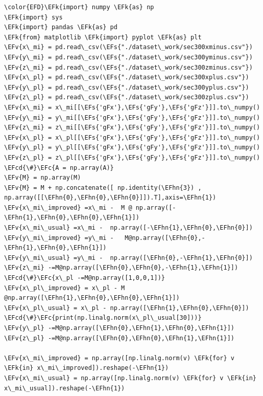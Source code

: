 \documentclass[11pt]{article}
\newcommand{\EFc}[1]{\textcolor{EFc}{#1}} %
\newcommand{\EFcd}[1]{\textcolor{EFcd}{#1}} %
\newcommand{\EFs}[1]{\textcolor{EFs}{#1}} %
\newcommand{\EFk}[1]{\textcolor{EFk}{#1}} %
\newcommand{\EFv}[1]{\textcolor{EFv}{#1}} %
\newcommand{\EFhn}[1]{\textcolor{EFhn}{#1}} %
\begin{document}
\begin{Code}
\begin{Verbatim}
\color{EFD}\EFk{import} numpy \EFk{as} np
\EFk{import} sys
\EFk{import} pandas \EFk{as} pd
\EFk{from} matplotlib \EFk{import} pyplot \EFk{as} plt 
\EFv{x\_mi} = pd.read\_csv(\EFs{"./dataset\_work/sec300xminus.csv"})
\EFv{y\_mi} = pd.read\_csv(\EFs{"./dataset\_work/sec300yminus.csv"})
\EFv{z\_mi} = pd.read\_csv(\EFs{"./dataset\_work/sec300zminus.csv"})
\EFv{x\_pl} = pd.read\_csv(\EFs{"./dataset\_work/sec300xplus.csv"})
\EFv{y\_pl} = pd.read\_csv(\EFs{"./dataset\_work/sec300yplus.csv"})
\EFv{z\_pl} = pd.read\_csv(\EFs{"./dataset\_work/sec300zplus.csv"})
\EFv{x\_mi} = x\_mi[[\EFs{'gFx'},\EFs{'gFy'},\EFs{'gFz'}]].to\_numpy()
\EFv{y\_mi} = y\_mi[[\EFs{'gFx'},\EFs{'gFy'},\EFs{'gFz'}]].to\_numpy()
\EFv{z\_mi} = z\_mi[[\EFs{'gFx'},\EFs{'gFy'},\EFs{'gFz'}]].to\_numpy()
\EFv{x\_pl} = x\_pl[[\EFs{'gFx'},\EFs{'gFy'},\EFs{'gFz'}]].to\_numpy()
\EFv{y\_pl} = y\_pl[[\EFs{'gFx'},\EFs{'gFy'},\EFs{'gFz'}]].to\_numpy()
\EFv{z\_pl} = z\_pl[[\EFs{'gFx'},\EFs{'gFy'},\EFs{'gFz'}]].to\_numpy()
\EFcd{\#}\EFc{A = np.array(A)}
\EFv{M} = np.array(M)
\EFv{M} = M + np.concatenate([ np.identity(\EFhn{3}) , np.array([[\EFhn{0},\EFhn{0},\EFhn{0}]]).T],axis=\EFhn{1})
\EFv{x\_mi\_improved} =x\_mi -  M @ np.array([-\EFhn{1},\EFhn{0},\EFhn{0},\EFhn{1}])
\EFv{x\_mi\_usual} =x\_mi -  np.array([-\EFhn{1},\EFhn{0},\EFhn{0}])
\EFv{y\_mi\_improved} =y\_mi -   M@np.array([\EFhn{0},-\EFhn{1},\EFhn{0},\EFhn{1}])
\EFv{y\_mi\_usual} =y\_mi -  np.array([\EFhn{0},-\EFhn{1},\EFhn{0}])
\EFv{z\_mi} -=M@np.array([\EFhn{0},\EFhn{0},-\EFhn{1},\EFhn{1}])
\EFcd{\#}\EFc{x\_pl -=M@np.array([1,0,0,1])}
\EFv{x\_pl\_improved} = x\_pl - M @np.array([\EFhn{1},\EFhn{0},\EFhn{0},\EFhn{1}])
\EFv{x\_pl\_usual} = x\_pl - np.array([\EFhn{1},\EFhn{0},\EFhn{0}])
\EFcd{\#}\EFc{print(np.linalg.norm(x\_pl\_usual[30]))}
\EFv{y\_pl} -=M@np.array([\EFhn{0},\EFhn{1},\EFhn{0},\EFhn{1}])
\EFv{z\_pl} -=M@np.array([\EFhn{0},\EFhn{0},\EFhn{1},\EFhn{1}])

\EFv{x\_mi\_improved} = np.array([np.linalg.norm(v) \EFk{for} v \EFk{in} x\_mi\_improved]).reshape(-\EFhn{1})
\EFv{x\_mi\_usual} = np.array([np.linalg.norm(v) \EFk{for} v \EFk{in} x\_mi\_usual]).reshape(-\EFhn{1})


\end{Verbatim}
\end{Code}
\end{document}

